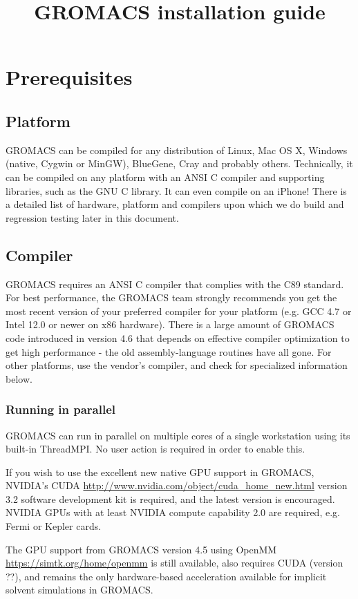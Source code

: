 \documentclass{article}[12pt,a4paper,twoside]
\title{GROMACS installation guide}
\newcommand{\gromacs}{GROMACS}
\newcommand{\nvidia}{NVIDIA}
\newcommand{\cuda}{CUDA}
\newcommand{\threadmpi}{ThreadMPI}
\newcommand{\openmm}{OpenMM}
\newcommand{\cudaversion}{3.2}
\begin{document}
\section{Prerequisites}

\subsection{Platform}

\gromacs{} can be compiled for any distribution of Linux, Mac OS X,
Windows (native, Cygwin or MinGW), BlueGene, Cray and probably others.
Technically, it can be compiled on any platform with an ANSI C
compiler and supporting libraries, such as the GNU C library. It can
even compile on an iPhone! There is a detailed list of hardware,
platform and compilers upon which we do build and regression testing
later in this document.

\subsection{Compiler}

\gromacs{} requires an ANSI C compiler that complies with the C89
standard. For best performance, the \gromacs{} team strongly
recommends you get the most recent version of your preferred compiler
for your platform (e.g. GCC 4.7 or Intel 12.0 or newer on x86
hardware). There is a large amount of \gromacs{} code introduced in
version 4.6 that depends on effective compiler optimization to get
high performance - the old assembly-language routines have all
gone. For other platforms, use the vendor's compiler, and check for
specialized information below.

\subsubsection{Running in parallel}

\gromacs{} can run in parallel on multiple cores of a single
workstation using its built-in \threadmpi. No user action is required
in order to enable this.

If you wish to use the excellent new native GPU support in \gromacs,
\nvidia{}'s \cuda{}
\url{http://www.nvidia.com/object/cuda_home_new.html} version
\cudaversion{} software development kit is required, and the latest
version is encouraged. \nvidia{} GPUs with at least \nvidia{} compute
capability 2.0 are required, e.g. Fermi or Kepler cards.

The GPU support from \gromacs{} version 4.5 using \openmm{}
\url{https://simtk.org/home/openmm} is still available, also requires
\cuda{} (version ??), and remains the only hardware-based acceleration
available for implicit solvent simulations in \gromacs{}.
\end{document}
